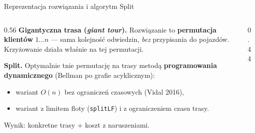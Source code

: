 \documentclass[aspectratio=169,11pt]{beamer}
\begin{document}
\begin{frame}{Reprezentacja rozwiązania i algorytm Split}
  \begin{columns}[T]
    \begin{column}{0.56\textwidth}
      \textbf{Gigantyczna trasa (\emph{giant tour}).} Rozwiązanie to \textbf{permutacja klientów} $1\ldots n$ — sama kolejność odwiedzin, \emph{bez} przypisania do pojazdów. Krzyżowanie działa właśnie na tej permutacji.
      \vspace{0.5em}

      \textbf{Split.} Optymalnie tnie permutację na trasy metodą \textbf{programowania dynamicznego} (Bellman po grafie acyklicznym):
      \begin{itemize}
        \item wariant \textbf{$O(n)$} bez ograniczeń czasowych (Vidal 2016),
        \item wariant z limitem floty (\texttt{splitLF}) i z ograniczeniem czasu trasy.
      \end{itemize}
      Wynik: konkretne trasy + koszt z naruszeniami.
    \end{column}
    \begin{column}{0.44\textwidth}
      \centering
      \par\vspace{0.2em}{\scriptsize Split rozdziela koszt krzyżowania od struktury tras.}
    \end{column}
  \end{columns}
\end{frame}
\end{document}
